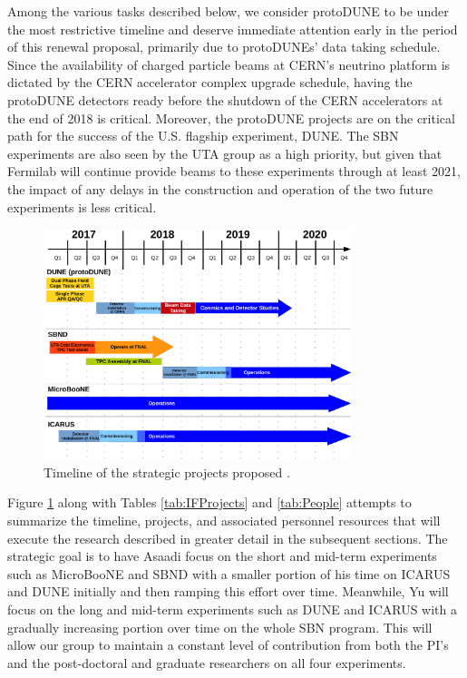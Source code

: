 Among the various tasks described below, we consider protoDUNE to be under the most restrictive timeline and deserve immediate  attention early in the period of this renewal proposal, primarily due to protoDUNEs' data taking schedule. Since the availability of charged particle beams at CERN's neutrino platform is dictated by the CERN accelerator complex upgrade schedule, having the protoDUNE detectors ready before the shutdown of the CERN accelerators at the end of 2018 is critical. Moreover, the protoDUNE projects are on the critical path for the success of the U.S. flagship experiment, DUNE. The SBN experiments are also seen by the UTA group as a high priority, but given that Fermilab will continue provide beams to these experiments through at least 2021, the impact of any delays in the construction and operation of the two future experiments is less critical.

\begin{figure}[htb]
\centering
\includegraphics[width=0.80\textwidth]{images/Timeline.pdf}
\caption[]{Timeline of the strategic projects proposed .}
\label{fig:IFTimeline}
\end{figure}

Figure \ref{fig:IFTimeline} along with Tables \ref{tab:IFProjects} and \ref{tab:People} attempts to summarize the timeline, projects, and associated personnel resources that will execute the research described in greater detail in the subsequent sections. The strategic goal is to have Asaadi focus on the short and mid-term experiments such as MicroBooNE and SBND with a smaller portion of his time on ICARUS and DUNE initially and then ramping this effort over time. Meanwhile, Yu will focus on the long and mid-term experiments such as DUNE and ICARUS with a gradually increasing portion over time on the whole SBN program. This will allow our group to maintain a constant level of contribution from both the PI's and the post-doctoral and graduate researchers on all four experiments.

